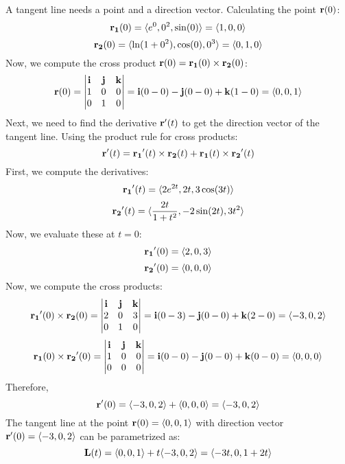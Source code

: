 \documentclass[reqno, 12pt]{amsart}
\begin{document}
\begin{itemize}
    \begin{answerbox}
      A tangent line needs a point and a direction vector. Calculating the point \( {\bf r}(0) \):
      \[
        {\bf r_1}(0) = \langle e^{0}, 0^2, \sin(0) \rangle = \langle 1, 0, 0 \rangle
      \]
      \[
        {\bf r_2}(0) = \langle \ln(1+0^2), \cos(0), 0^3 \rangle = \langle 0, 1, 0 \rangle
      \]
      Now, we compute the cross product \( {\bf r}(0) = {\bf r_1}(0) \times {\bf r_2}(0) \):
      \[
        {\bf r}(0) =
        \begin{vmatrix}
          \mathbf{i} & \mathbf{j} & \mathbf{k} \\
          1 & 0 & 0 \\
          0 & 1 & 0
        \end{vmatrix} = \mathbf{i}(0 - 0) - \mathbf{j}(0 - 0) + \mathbf{k}(1 - 0) = \langle 0, 0, 1 \rangle
      \]
      Next, we need to find the derivative \( {\bf r}'(t) \) to get the direction vector of the tangent line. Using the product rule for cross products:
      \[
        {\bf r}'(t) = {\bf r_1}'(t) \times {\bf r_2}(t) + {\bf r_1}(t) \times {\bf r_2}'(t)
      \]
      First, we compute the derivatives:
      \[
        {\bf r_1}'(t) = \langle 2e^{2t}, 2t, 3\cos(3t) \rangle
      \]
      \[
        {\bf r_2}'(t) = \langle \frac{2t}{1+t^2}, -2\sin(2t), 3t^2 \rangle
      \]
      Now, we evaluate these at \( t = 0 \):
      \[
        {\bf r_1}'(0) = \langle 2, 0, 3 \rangle
      \]
      \[
        {\bf r_2}'(0) = \langle 0, 0, 0 \rangle
      \]
      Now, we compute the cross products:
      \[
        {\bf r_1}'(0) \times {\bf r_2}(0) =
        \begin{vmatrix}
          \mathbf{i} & \mathbf{j} & \mathbf{k} \\
          2 & 0 & 3 \\
          0 & 1 & 0
        \end{vmatrix} = \mathbf{i}(0 - 3) - \mathbf{j}(0 - 0) + \mathbf{k}(2 - 0) = \langle -3, 0, 2 \rangle
      \]
      \[
        {\bf r_1}(0) \times {\bf r_2}'(0) =
        \begin{vmatrix}
          \mathbf{i} & \mathbf{j} & \mathbf{k} \\
          1 & 0 & 0 \\
          0 & 0 & 0
        \end{vmatrix} = \mathbf{i}(0 - 0) - \mathbf{j}(0 - 0) + \mathbf{k}(0 - 0) = \langle 0, 0, 0 \rangle
      \]
      Therefore,
      \[
        {\bf r}'(0) = \langle -3, 0, 2 \rangle + \langle 0, 0, 0 \rangle = \langle -3, 0, 2 \rangle
      \]
      The tangent line at the point \( {\bf r}(0) = \langle 0, 0, 1 \rangle \) with direction vector \( {\bf r}'(0) = \langle -3, 0, 2 \rangle \) can be parametrized as:
      \[
        {\bf L}(t) = \langle 0, 0, 1 \rangle + t \langle -3, 0, 2 \rangle = \langle -3t, 0, 1 + 2t \rangle
      \]


\end{answerbox}
\end{itemize}
\end{document}
